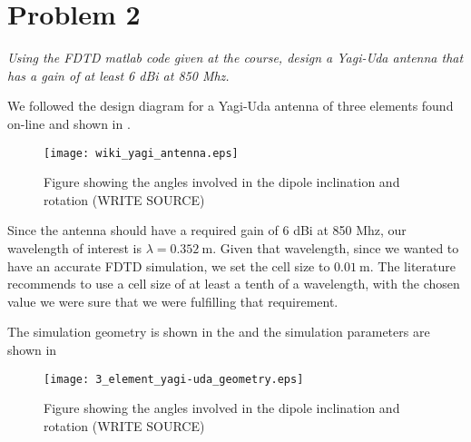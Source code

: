 \section{Problem 2}
\textit{Using the FDTD matlab code given at the course, design a Yagi-Uda antenna that has a gain of at least 6 dBi at 850 Mhz.}


We followed the design diagram for a Yagi-Uda antenna of three elements found on-line and shown in .

\begin{figure}[!h]
  \centering
  \texttt{[image: wiki\_yagi\_antenna.eps]}
  \caption{Figure showing the angles involved in the dipole inclination and rotation (WRITE SOURCE)}
  \label{fig:wiki_yagi_antenna}
\end{figure}

Since the antenna should have a required gain of 6 dBi at 850 Mhz, our wavelength of interest is $\lambda = \SI{0.352}{\meter}$. Given that wavelength, since we wanted to have an accurate FDTD simulation, we set the cell size to $\SI{0.01}{\meter}$. The literature recommends to use a cell size of at least a tenth of a wavelength, with the chosen value we were sure that we were fulfilling that requirement.

The simulation geometry is shown in the  and the simulation parameters are shown in 

\begin{figure}[!h]
  \centering
  \texttt{[image: 3\_element\_yagi-uda\_geometry.eps]}
  \caption{Figure showing the angles involved in the dipole inclination and rotation (WRITE SOURCE)}
  \label{fig:3_element_yagi-uda_geometry}
\end{figure}



